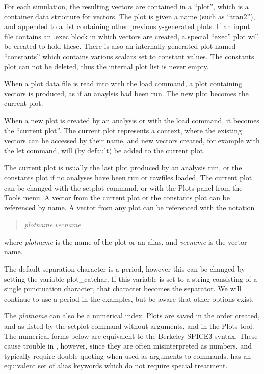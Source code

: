 For each simulation, the resulting vectors are contained in a
``plot'', which is a container data structure for vectors.  The plot
is given a name (such as ``tran2''), and appended to a list containing
other previously-generated plots.  If an input file contains an {\vt
.exec} block in which vectors are created, a special ``exec'' plot
will be created to hold these.  There is also an internally generated
plot named ``{\vt constants}'' which contains various scalars set to
constant values.  The {\vt constants} plot can not be deleted, thus
the internal plot list is never empty.

When a plot data file is read into {\WRspice} with the {\cb load}
command, a plot containing vectors is produced, as if an anaylsis had
been run.  The new plot becomes the current plot.

When a new plot is created by an analysis or with the {\cb load}
command, it becomes the ``current plot''.  The current plot represents
a context, where the existing vectors can be accessed by their name,
and new vectors created, for example with the {\cb let} command, will
(by default) be added to the current plot.

The current plot is usually the last plot produced by an analysis run,
or the {\vt constants} plot if no analyses have been run or rawfiles
loaded.  The current plot can be changed with the {\cb setplot}
command, or with the {\cb Plots} panel from the {\cb Tools} menu.  A
vector from the current plot or the {\vt constants} plot can be
referenced by name.  A vector from any plot can be referenced with the
notation
\begin{quote}
{\it plotname\/}.{\it vecname}
\end{quote}
where {\it plotname} is the name of the plot or an alias, and {\it
vecname} is the vector name.

The default separation character is a period, however this can be
changed by setting the variable {\et plot\_catchar}.  If this variable
is set to a string consisting of a single punctuation character, that
character becomes the separator.  We will continue to use a period in
the examples, but be aware that other options exist.

The {\it plotname} can also be a numerical index.  Plots are saved in
the order created, and as listed by the {\cb setplot} command without
arguments, and in the {\cb Plots} tool.  The numerical forms below are
equivalent to the Berkeley SPICE3 syntax.  These cause trouble in
{\WRspice}, however, since they are often misinterpreted as numbers,
and typically require double quoting when used as arguments to
commands.  {\WRspice} has an equivalent set of alias keywords which do
not require special treatment. 

